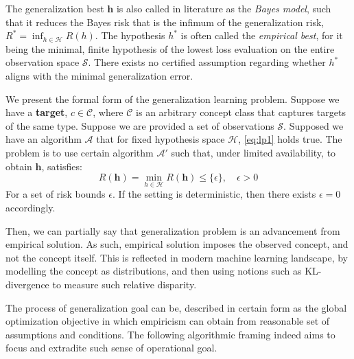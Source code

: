 The generalization best $\bm{h}$ is also called in literature as the \textit{Bayes model}, such that it reduces the Bayes risk that is the infimum of the generalization risk, $R^{*}=\inf_{h\in \mathcal{H}}R(h)$. The hypothesis $h^{*}$ is often called the \textit{empirical best}, for it being the minimal, finite hypothesis of the lowest loss evaluation on the entire observation space $\mathcal{S}$. There exists no certified assumption regarding whether $h^{*}$ aligns with the minimal generalization error.

\begin{definition}
    We present the formal form of the generalization learning problem. Suppose we have a \textbf{target}, $c\in\mathcal{C}$, where $\mathcal{C}$ is an arbitrary concept class that captures targets of the same type. Suppose we are provided a set of observations $\mathcal{S}$. Supposed we have an algorithm $\mathcal{A}$ that for fixed hypothesis space $\mathcal{H}$, \eqref{eq:lp1} holds true. The problem is to use certain algorithm $\mathcal{A}'$ such that, under limited availability, to obtain $\bm{h}$, satisfies: \begin{equation}
        R(\bm{h}) = \min_{h\in \mathcal{H}} R(\bm{h}) \leq \{\epsilon\}, \quad \epsilon > 0 
    \end{equation}
    For a set of risk bounds $\epsilon$. If the setting is deterministic, then there exists $\epsilon=0$ accordingly. 
\end{definition}

Then, we can partially say that generalization problem is an advancement from empirical solution. As such, empirical solution imposes the observed concept, and not the concept itself. This is reflected in modern machine learning landscape, by modelling the concept as distributions, and then using notions such as KL-divergence to measure such relative disparity. 

The process of generalization goal can be, described in certain form as the global optimization objective in which empiricism can obtain from reasonable set of assumptions and conditions. The following algorithmic framing indeed aims to focus and extradite such sense of operational goal. 

